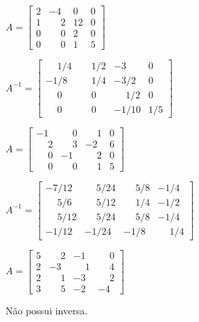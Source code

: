 \documentclass[12pt]{exam}
\begin{document}
\begin{exercicio}
    $
        A = \begin{bmatrix}
            2 & -4 & 0 & 0\\
            1 & \phantom{-}2 & 12 & 0\\
            0 & \phantom{-}0 & 2 & 0\\
            0 & \phantom{-}0 & 1 & 5
        \end{bmatrix}
    $
    \begin{solucao}
        $
            A^{-1} = \begin{bmatrix}
                \phantom{-}1/4 & \phantom{-}1/2 & -3 & 0\\
                -1/8 & \phantom{-}1/4 & -3/2 & 0\\
                \phantom{-}0 & \phantom{-}0 & \phantom{-}1/2 & 0\\
                \phantom{-}0 & \phantom{-}0 & -1/10 & 1/5
            \end{bmatrix}
        $
    \end{solucao}
\end{exercicio}

\begin{exercicio}
    $
    A = \begin{bmatrix}
        -1 & \phantom{-}0 & \phantom{-}1 & 0\\
        \phantom{-}2 & \phantom{-}3 & -2 & 6\\
        \phantom{-}0 & -1 & \phantom{-}2 & 0\\
        \phantom{-}0 & \phantom{-}0 & \phantom{-}1 & 5
    \end{bmatrix}
    $
    \begin{solucao}
        $
        A^{-1} = \begin{bmatrix}
            -7/12 & \phantom{-}5/24 & \phantom{-}5/8 & -1/4\\
            \phantom{-}5/6 & \phantom{-}5/12 & \phantom{-}1/4 & -1/2\\
            \phantom{-}5/12 & \phantom{-}5/24 & \phantom{-}5/8 & -1/4\\
            -1/12 & -1/24 & -1/8 & \phantom{-}1/4
        \end{bmatrix}
        $
    \end{solucao}
\end{exercicio}

\begin{exercicio}
    $
    A = \begin{bmatrix}
        5 & \phantom{-}2 & -1 & \phantom{-}0\\
        2 & -3 & \phantom{-}1 & \phantom{-}4\\
        2 & \phantom{-}1 & -3 & \phantom{-}2\\
        3 & \phantom{-}5 & -2 & -4
    \end{bmatrix}
    $
    \begin{solucao}
        Não possui inversa.
    \end{solucao}
\end{exercicio}
\end{document}
